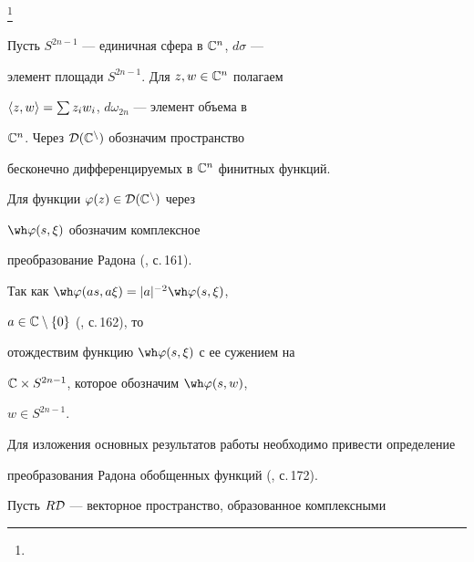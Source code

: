 \thanks{}





\date{}




\pagestyle{plain} %







\maketitle


\label{begin}








Пусть $S^{2n-1}$ --- единичная сфера в $\Bbb C^{n}$, $d\sigma$ ---


элемент площади $S^{2n-1}$. Для $z,w\in\Bbb C^{n}$ полагаем


$\langle z,w\rangle=\sum z_{i}w_{i}$, $d\omega_{2n}$ --- элемент объема в


$\Bbb C^{n}$. Через $\cal D(\Bbb C^{n})$ обозначим пространство 


бесконечно дифференцируемых в $\Bbb C^{n}$ финитных функций.





Для функции $\varphi(z)\in \cal D(\Bbb C^{n})$ через


$\wh\varphi(s,\xi)$ обозначим комплексное 


преобразование Радона (\cite{Gelf}, с.\,161).


Так как $\wh\varphi(as,a\xi)=|a|^{-2}\wh\varphi(s,\xi)$,


$a\in \Bbb C\setminus \{0\}$ (\cite{Gelf}, с.\,162), то 


отождествим функцию $\wh\varphi(s,\xi)$ с ее сужением на 


$\Bbb C\times S^{2n-1}$, которое обозначим $\wh\varphi(s,w)$,


$w \in S^{2n-1}$.





Для изложения основных результатов работы необходимо привести определение 


преобразования Радона обобщенных функций (\cite{Gelf}, с.\,172).


Пусть $R\cal D$ --- векторное пространство, образованное комплексными 


